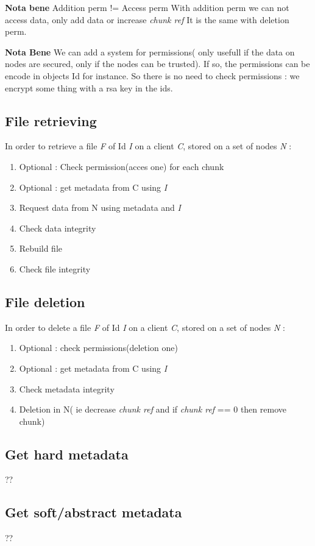 \documentclass[a4paper,10pt]{article}
\begin{document}
\textbf{Nota bene}
Addition perm != Access perm
With addition perm we can not access data, only add data or increase \textit{chunk ref}
It is the same with deletion perm.

\textbf{Nota Bene}
We can add a system for permissions( only usefull if the data on nodes are secured, only if the nodes can be trusted). If so, 
the permissions can be encode in objects Id for instance. So there is no need to check permissions : we encrypt some thing with 
a rsa key in the ids.

\subsection{File retrieving}%
In order to retrieve a file \textit{F} of Id \textit{I} on a client \textit{C}, stored on a set of 
nodes \textit{N} : 
\begin{enumerate}
 \item Optional : Check permission(acces one) for each chunk
 \item Optional : get metadata from C using \textit{I}
 \item Request data from N using metadata and \textit{I}
 \item Check data integrity
 \item Rebuild file
 \item Check file integrity
\end{enumerate}

\subsection{File deletion}
In order to delete a file \textit{F} of Id \textit{I} on a client \textit{C}, 
stored on a set of 
nodes \textit{N} :
\begin{enumerate}
 \item Optional : check permissions(deletion one)
 \item Optional : get metadata from C using \textit{I}
 \item Check metadata integrity
 \item Deletion in N( ie decrease \textit{chunk ref} and if 
  \textit{chunk ref} == 0 then remove chunk)
\end{enumerate}

\subsection{Get hard metadata}
??

\subsection{Get soft/abstract metadata}
??








\end{document}
